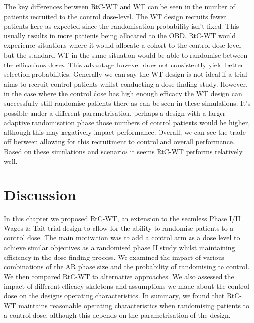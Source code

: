 The key differences between RtC-WT and WT can be seen in the number of patients recruited to the control dose-level. The WT design recruits fewer patients here as expected since the randomisation probability isn't fixed. This usually results in more patients being allocated to the OBD. RtC-WT would experience situations where it would allocate a cohort to the control dose-level but the standard WT in the same situation would be able to randomise between the efficacious doses. This advantage however does not consistently yield better selection probabilities. Generally we can say the WT design is not ideal if a trial aims to recruit control patients whilst conducting a dose-finding study. However, in the case where the control dose has high enough efficacy the WT design can successfully still randomise patients there as can be seen in these simulations. It's possible under a different parametrisation, perhaps a design with a larger adaptive randomisation phase those numbers of control patients would be higher, although this may negatively impact performance. Overall, we can see the trade-off between allowing for this recruitment to control and overall performance. Based on these simulations and scenarios it seems RtC-WT performs relatively well.

\section{Discussion}
\label{WT:Discussion}

In this chapter we proposed RtC-WT, an extension to the seamless Phase \RN{1}/\RN{2} Wages \& Tait trial design to allow for the ability to randomise patients to a control dose. The main motivation was to add a control arm as a dose level to achieve similar objectives as a randomised phase \RN{2} study whilst maintaining efficiency in the dose-finding process. We examined the impact of various combinations of the AR phase size and the probability of randomising to control. We then compared RtC-WT to alternative approaches. We also assessed the impact of different efficacy skeletons and assumptions we made about the control dose on the designs operating characteristics. In summary, we found that RtC-WT maintains reasonable operating characteristics when randomising patients to a control dose, although this depends on the parametrisation of the design.   

